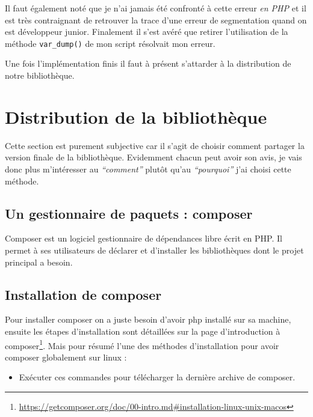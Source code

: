 \documentclass[11pt,a4paper,krantz2,11pt,oneside]{krantz}
\providecommand{\tightlist}{%
  \setlength{\itemsep}{0pt}\setlength{\parskip}{0pt}}
\renewenvironment{quote}{\begin{VF}}{\end{VF}}
\renewcommand{\href}[2]{#2\footnote{\url{#1}}}
\begin{document}
Il faut également noté que je n'ai jamais été confronté à cette erreur \emph{en PHP} et il est très contraignant de retrouver la trace d'une erreur de segmentation quand on est développeur junior. Finalement il s'est avéré que retirer l'utilisation de la méthode \texttt{var\_dump()} de mon script résolvait mon erreur.

Une fois l'implémentation finis il faut à présent s'attarder à la distribution de notre bibliothèque.

\hypertarget{distribution-de-la-bibliothuxe8que}{%
\section{Distribution de la bibliothèque}\label{distribution-de-la-bibliothuxe8que}}

Cette section est purement subjective car il s'agit de choisir comment partager la version finale de la bibliothèque. Evidemment chacun peut avoir son avis, je vais donc plus m'intéresser au \emph{``comment''} plutôt qu'au \emph{``pourquoi''} j'ai choisi cette méthode.

\hypertarget{un-gestionnaire-de-paquets-composer}{%
\subsection{Un gestionnaire de paquets : composer}\label{un-gestionnaire-de-paquets-composer}}

\begin{quote}
Composer est un logiciel gestionnaire de dépendances libre écrit en PHP. Il permet à ses utilisateurs de déclarer et d'installer les bibliothèques dont le projet principal a besoin.

\end{quote}

\hypertarget{install-composer}{%
\subsection{Installation de composer}\label{install-composer}}

Pour installer composer on a juste besoin d'avoir php installé sur sa machine, ensuite les étapes d'installation sont détaillées sur la page d'\href{https://getcomposer.org/doc/00-intro.md\#installation-linux-unix-macos}{introduction à composer}. Mais pour résumé l'une des méthodes d'installation pour avoir composer globalement sur linux :

\begin{itemize}
\tightlist
\item
  Exécuter ces commandes pour télécharger la dernière archive de composer.
\end{itemize}
\end{document}
